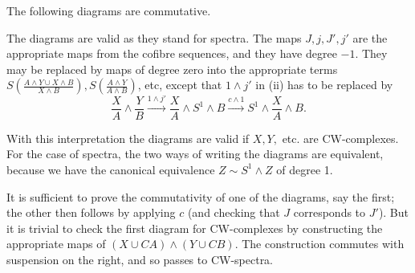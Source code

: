 \documentclass[../main]{subfiles}
\begin{document}
\begin{lemma}\label{lem:p3c09.9}  The following diagrams are commutative.
\begin{center}
\end{center}
\begin{center}
\end{center}
\end{lemma}

\begin{notes}  The diagrams are valid as they stand for spectra. The maps $J, j, J', j'$ are the appropriate maps from the cofibre sequences, and they have degree $-1$. They may be replaced by maps of degree zero into the appropriate terms $S(\frac{A \wedge Y \cup X \wedge B}{X \wedge B}), S(\frac{A \wedge Y}{A \wedge B})$, etc, except that $1 \wedge j'$ in (ii) has to be replaced by $$\frac{X}{A} \wedge \frac{Y}{B} \xrightarrow{1\wedge j'} \frac{X}{A} \wedge S^1 \wedge B \xrightarrow{c \wedge 1} S^1 \wedge \frac{X}{A} \wedge B.$$

With this interpretation the diagrams are valid if $X, Y,$ etc. are CW-complexes.  For the case of spectra, the two ways of writing the diagrams are equivalent, because we have the canonical equivalence $Z \sim S^1 \wedge Z$ of degree 1.

\par It is sufficient to prove the commutativity of one of the diagrams, say the first; the other then follows by applying $c$ (and checking that $J$ corresponds to $J'$). But it is trivial to check the first diagram for CW-complexes by constructing the appropriate maps of $(X \cup CA) \wedge (Y \cup CB)$. The construction commutes with suspension on the right, and so passes
to CW-spectra.

\end{notes}
\end{document}

